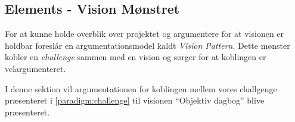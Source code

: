\subsection{Elements - Vision Mønstret}
For at kunne holde overblik over projektet og argumentere for at visionen er holdbar foreslår \citet[Kapitel 15 - Project]{art:essence} en argumentationsmodel kaldt \emph{Vision Pattern}. 
Dette mønster kobler en \emph{challenge} sammen med en vision og sørger for at koblingen er velargumenteret.

I denne sektion vil argumentationen for koblingen mellem vores challgenge præsenteret i \cref{paradigm:challenge} til visionen ``Objektiv dagbog'' blive præsenteret.





